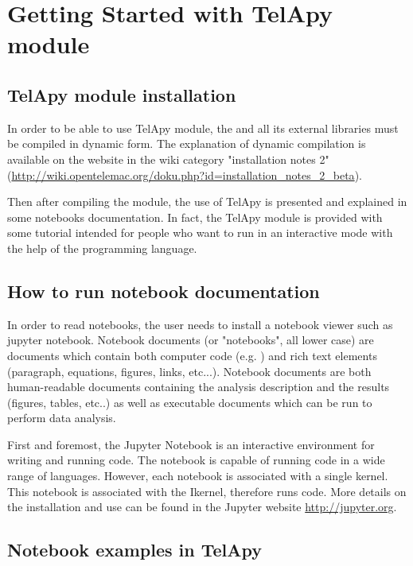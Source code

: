 \chapter{ Getting Started with TelApy  module}
\label{ch:inp:outp}

\section{TelApy module installation}

In order to be able to use TelApy module, the \telemacsystem and all its
external libraries must be compiled in dynamic form. The explanation of dynamic
compilation is available on the \telemacsystem website in the wiki category
"installation notes 2"
(\url{http://wiki.opentelemac.org/doku.php?id=installation_notes_2_beta}).

Then after compiling the module, the use of TelApy is presented and explained
in some notebooks documentation. In fact, the TelApy module is provided with
some tutorial intended for people who want to run  in an
interactive mode with the help of the \python programming language.

\section{How to run notebook documentation}

In order to read notebooks, the user needs to install a notebook viewer such as
jupyter notebook. Notebook documents (or "notebooks", all lower case) are
documents which contain both computer code (e.g. \python) and rich text elements
(paragraph, equations, figures, links, etc...). Notebook documents are both
human-readable documents containing the analysis description and the results
(figures, tables, etc..) as well as executable documents which can be run to
perform data analysis.

First and foremost, the Jupyter Notebook is an interactive environment for
writing and running code. The notebook is capable of running code in a wide
range of languages. However, each notebook is associated with a single kernel.
This notebook is associated with the I\python kernel, therefore runs \python
code. More details on the installation and use can be found in the Jupyter
website \url{http://jupyter.org}.

\section{Notebook examples in TelApy}

